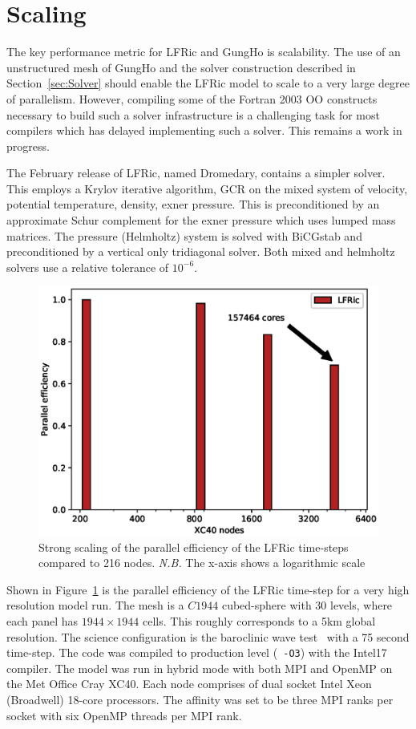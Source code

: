 \documentclass[review,times]{elsarticle}
\begin{document}
\section{\label{sec:scal}Scaling}
The key performance metric for
LFRic and GungHo is scalability. The use of an unstructured mesh of
GungHo and the solver construction described in
Section~\ref{sec:Solver} should enable the LFRic model to scale to a
very large degree of parallelism. However, compiling some of the
Fortran 2003 OO constructs necessary to build such a solver
infrastructure is a challenging task for most compilers which has
delayed implementing such a solver. This remains a work in progress.

The February release of LFRic, named Dromedary, contains a simpler
solver. This employs a Krylov iterative algorithm, GCR on the mixed
system of velocity, potential temperature, density, exner
pressure. This is preconditioned by an approximate Schur complement
for the exner pressure which uses lumped mass matrices. The pressure
(Helmholtz) system is solved with BiCGstab and preconditioned by a
vertical only tridiagonal solver. Both mixed and helmholtz solvers use
a relative tolerance of $10^{-6}$.

\begin{figure}
  \begin{center}
    \includegraphics[width=0.85\linewidth]{scale.eps}
    \caption{\label{fig:scale_PE}Strong scaling of the parallel efficiency of the LFRic 
      time-steps compared to 216 nodes. {\em N.B.} The x-axis shows a
      logarithmic scale}
  \end{center}
\end{figure}

Shown in Figure~\ref{fig:scale_PE} is 
the parallel efficiency of the LFRic time-step for a very high 
resolution model run. The mesh is a $C1944$ cubed-sphere with 30 
levels, where each panel has $1944 \times 1944$ cells. This roughly corresponds 
to a 5km global resolution. The science configuration is the baroclinic wave 
test~\cite{qj.2241} with a 75 second time-step. The code was compiled 
to production level (\verb+ -O3+) with the Intel17 compiler. The model 
was run in hybrid mode with both MPI and OpenMP on the Met Office Cray 
XC40. Each node comprises of dual socket Intel Xeon (Broadwell) 
18-core processors. The affinity was set to be three MPI ranks per 
socket with six OpenMP threads per MPI rank. 
\end{document}
